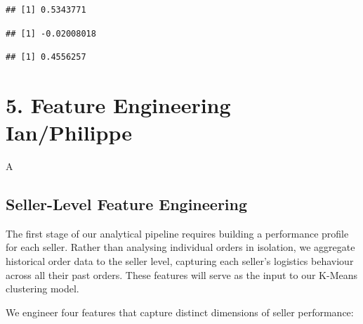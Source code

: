 \documentclass[
]{article}
\newenvironment{Shaded}{\begin{snugshade}}{\end{snugshade}}
\newcommand{\AttributeTok}[1]{\textcolor[rgb]{0.13,0.29,0.53}{#1}}
\newcommand{\ConstantTok}[1]{\textcolor[rgb]{0.56,0.35,0.01}{#1}}
\newcommand{\FunctionTok}[1]{\textcolor[rgb]{0.13,0.29,0.53}{\textbf{#1}}}
\newcommand{\NormalTok}[1]{#1}
\newcommand{\SpecialCharTok}[1]{\textcolor[rgb]{0.81,0.36,0.00}{\textbf{#1}}}
\begin{document}
\begin{verbatim}
## [1] 0.5343771
\end{verbatim}

\begin{Shaded}
\end{Shaded}

\begin{verbatim}
## [1] -0.02008018
\end{verbatim}

\begin{Shaded}
\end{Shaded}

\begin{verbatim}
## [1] 0.4556257
\end{verbatim}

\section{5. Feature Engineering
Ian/Philippe}\label{feature-engineering-ianphilippe}

A

\subsection{Seller-Level Feature
Engineering}\label{seller-level-feature-engineering}

The first stage of our analytical pipeline requires building a
performance profile for each seller. Rather than analysing individual
orders in isolation, we aggregate historical order data to the seller
level, capturing each seller's logistics behaviour across all their past
orders. These features will serve as the input to our K-Means clustering
model.

We engineer four features that capture distinct dimensions of seller
performance:
\end{document}
